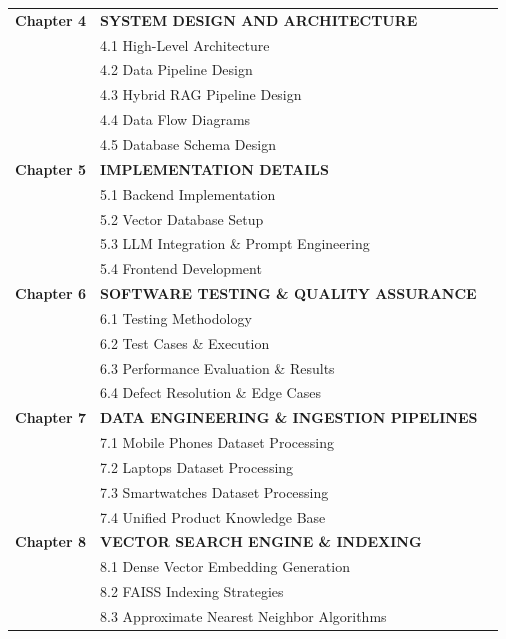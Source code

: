 \documentclass[12pt,a4paper]{article}
\begin{document}
\begin{longtable}{@{} p{2.2cm} p{11.8cm} r @{}}
\textbf{Chapter 4} & \textbf{SYSTEM DESIGN AND ARCHITECTURE} & \pageref{chap:4} \\[4pt]
& 4.1 High-Level Architecture & \pageref{sec:4.1} \\[3pt]
& 4.2 Data Pipeline Design & \pageref{sec:4.2} \\[3pt]
& 4.3 Hybrid RAG Pipeline Design & \pageref{sec:4.3} \\[3pt]
& 4.4 Data Flow Diagrams & \pageref{sec:4.4} \\[3pt]
& 4.5 Database Schema Design & \pageref{sec:4.5} \\[6pt]
\textbf{Chapter 5} & \textbf{IMPLEMENTATION DETAILS} & \pageref{chap:5} \\[4pt]
& 5.1 Backend Implementation & \pageref{sec:5.1} \\[3pt]
& 5.2 Vector Database Setup & \pageref{sec:5.2} \\[3pt]
& 5.3 LLM Integration \& Prompt Engineering & \pageref{sec:5.3} \\[3pt]
& 5.4 Frontend Development & \pageref{sec:5.4} \\[6pt]
\textbf{Chapter 6} & \textbf{SOFTWARE TESTING \& QUALITY ASSURANCE} & \pageref{chap:6} \\[4pt]
& 6.1 Testing Methodology & \pageref{sec:6.1} \\[3pt]
& 6.2 Test Cases \& Execution & \pageref{sec:6.2} \\[3pt]
& 6.3 Performance Evaluation \& Results & \pageref{sec:6.3} \\[3pt]
& 6.4 Defect Resolution \& Edge Cases & \pageref{sec:6.4} \\[6pt]
\textbf{Chapter 7} & \textbf{DATA ENGINEERING \& INGESTION PIPELINES} & \pageref{chap:7} \\[4pt]
& 7.1 Mobile Phones Dataset Processing & \pageref{sec:7.1} \\[3pt]
& 7.2 Laptops Dataset Processing & \pageref{sec:7.2} \\[3pt]
& 7.3 Smartwatches Dataset Processing & \pageref{sec:7.3} \\[3pt]
& 7.4 Unified Product Knowledge Base & \pageref{sec:7.4} \\[6pt]
\textbf{Chapter 8} & \textbf{VECTOR SEARCH ENGINE \& INDEXING} & \pageref{chap:8} \\[4pt]
& 8.1 Dense Vector Embedding Generation & \pageref{sec:8.1} \\[3pt]
& 8.2 FAISS Indexing Strategies & \pageref{sec:8.2} \\[3pt]
& 8.3 Approximate Nearest Neighbor Algorithms & \pageref{sec:8.3} \\[3pt]

\end{longtable}
\end{document}
